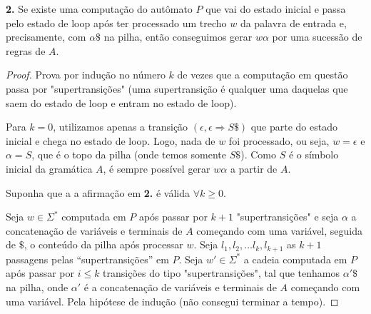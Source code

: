 \textbf{2.} Se existe uma computação do autômato $P$ que vai do estado inicial e passa pelo estado de loop após ter processado um trecho $w$ da palavra de entrada e, precisamente, com $\alpha\$$ na pilha, então conseguimos gerar $w\alpha$ por uma sucessão de regras de $A$.
\begin{proof} Prova por indução no número $k$ de vezes que a computação em questão passa por "supertransições" (uma supertransição é qualquer uma daquelas que saem do estado de loop e entram no estado de loop).

\indbase Para $k = 0$, utilizamos apenas a transição $(\epsilon, \epsilon \Rightarrow S\$)$ que parte do estado inicial e chega no estado de loop. Logo, nada de $w$ foi processado, ou seja, $w = \epsilon$ e $\alpha = S$, que é o topo da pilha (onde temos somente $S\$$). Como $S$ é o símbolo inicial da gramática $A$, é sempre possível gerar $w\alpha$ a partir de $A$.

\indhypo Suponha que a a afirmação em \textbf{2.} é válida $\forall k \geq 0$.

\indstep Seja $w \in \Sigma^*$ computada em $P$ após passar por $k + 1$ "supertransições" e seja $\alpha$ a concatenação de variáveis e terminais de $A$ começando com uma variável, seguida de $\$$, o conteúdo da pilha após processar $w$. Seja $l_1, l_2, \ldots l_k, l_{k+1}$ as $k+1$ passagens pelas “supertransições” em $P$. Seja $w' \in \Sigma^*$ a cadeia computada em $P$ após passar por $i \leq k$ transições do tipo "supertransições", tal que tenhamos $\alpha'\$$ na pilha, onde $\alpha'$ é a concatenação de variáveis e terminais de $A$ começando com uma variável. Pela hipótese de indução (não consegui terminar a tempo).
\end{proof}